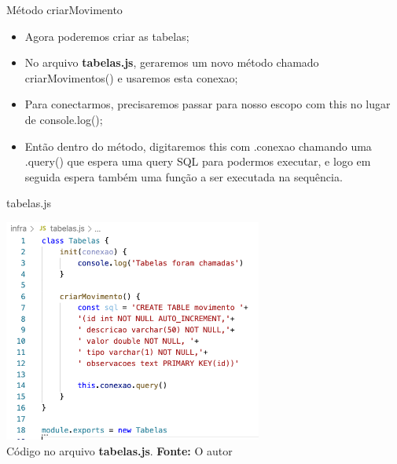 \documentclass{beamer}
\begin{document}
  \begin{frame}{Método criarMovimento}
   \begin{itemize}
   \item Agora poderemos criar as tabelas; 
   \item No arquivo \textbf{tabelas.js}, geraremos um novo método chamado \alert{criarMovimentos()} e usaremos esta conexao;
   \item Para conectarmos, precisaremos passar para nosso escopo com \alert{this} no lugar de \alert{console.log()};
   \item Então dentro do método, digitaremos this com .conexao chamando uma .query() que espera uma query SQL para podermos executar, e logo em seguida espera também uma função a ser executada na sequência.
   \end{itemize}
  \end{frame}
    \begin{frame}{tabelas.js}
         \begin{center}
    	\includegraphics[width=85mm]{resources/aula6_7.png}\\
        \tiny{ Código no arquivo \textbf{tabelas.js}. \textbf{Fonte:} O autor}
     \end{center}   
    \end{frame}
\end{document}
